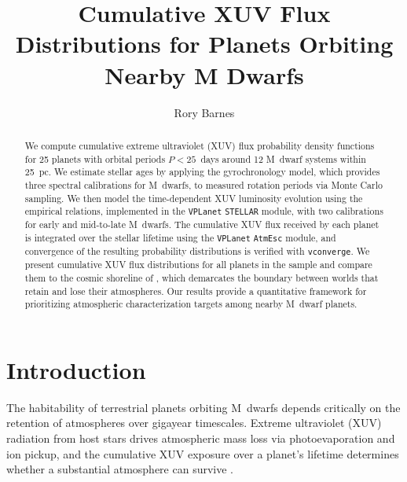 \documentclass[twocolumn]{aastex631}
\newcommand{\vplanet}{\texttt{VPLanet}}
\newcommand{\vconverge}{\texttt{vconverge}}
\begin{document}
\title{Cumulative XUV Flux Distributions for Planets Orbiting Nearby M Dwarfs}

\author{Rory Barnes}


\begin{abstract}
We compute cumulative extreme ultraviolet (XUV) flux probability density
functions for 25 planets with orbital periods $P < 25$~days around 12
M~dwarf systems within 25~pc. We estimate stellar ages by applying the
\citet{EngleGuinan2023} gyrochronology model, which provides three spectral
calibrations for M~dwarfs, to measured rotation periods via Monte Carlo
sampling. We then model the time-dependent XUV luminosity evolution using the
\citet{Engle2024} empirical relations, implemented in the \vplanet{}
\texttt{STELLAR} module, with two calibrations for early and mid-to-late
M~dwarfs. The cumulative XUV flux received by each planet is integrated over
the stellar lifetime using the \vplanet{} \texttt{AtmEsc} module, and
convergence of the resulting probability distributions is verified with
\vconverge{}. We present cumulative XUV flux distributions for all planets in
the sample and compare them to the cosmic shoreline of
\citet{ZahnleCatling2017}, which demarcates the boundary between worlds that
retain and lose their atmospheres. Our results provide a quantitative framework
for prioritizing atmospheric characterization targets among nearby M~dwarf
planets.
\end{abstract}


\section{Introduction} \label{sec:intro}

The habitability of terrestrial planets orbiting M~dwarfs depends critically on
the retention of atmospheres over gigayear timescales. Extreme ultraviolet
(XUV) radiation from host stars drives atmospheric mass loss via
photoevaporation and ion pickup, and the cumulative XUV exposure over a
planet's lifetime determines whether a substantial atmosphere can survive
\citep{Ribas2005, Barnes2020}.
\end{document}
